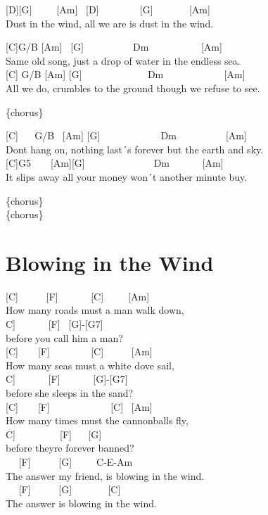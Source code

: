 \documentclass[
  letterpaper,
]{scrbook}
\begin{document}
{[}D{]}{[}G{]} ~ ~ ~{[}Am{]} ~{[}D{]} ~ ~ ~ ~ ~{[}G{]} ~ ~ ~ ~
{[}Am{]}\\
Dust in the wind, all we are is dust in the wind.

{[}C{]}G/B {[}Am{]} ~{[}G{]} ~ ~ ~ ~ ~ ~Dm ~ ~ ~ ~ ~ ~ {[}Am{]}\\
Same old song, just a drop of water in the endless sea.\\
{[}C{]} G/B {[}Am{]} {[}G{]} ~ ~ ~ ~ ~ ~ ~ ~Dm ~ ~ ~ ~ ~ ~ ~ {[}Am{]}\\
All we do, crumbles to the ground though we refuse to see.

\{chorus\}

{[}C{]} ~ ~G/B ~{[}Am{]} {[}G{]} ~ ~ ~ ~ ~ ~ ~ Dm ~ ~ ~ ~ ~ ~{[}Am{]}\\
Don\textquotesingle t hang on, nothing last´s forever but the earth and
sky.\\
{[}C{]}G5 ~ ~ {[}Am{]}{[}G{]} ~ ~ ~ ~ ~ ~ ~ ~ Dm ~ ~ ~ ~{[}Am{]}\\
It slips away all your money won´t another minute buy.

\{chorus\}\\
\{chorus\}

\hypertarget{blowing-in-the-wind}{%
\chapter{Blowing in the Wind}\label{blowing-in-the-wind}}

{[}C{]} ~ ~ ~ {[}F{]} ~ ~ ~ ~{[}C{]} ~ ~ ~{[}Am{]}\\
How many roads must a man walk down,\\
\hspace*{0.333em}{[}C{]} ~ ~ ~ ~{[}F{]} ~{[}G{]}-{[}G7{]}\\
before you call him a man?\\
{[}C{]} ~ ~ {[}F{]} ~ ~ ~ ~ ~{[}C{]} ~ ~ ~ {[}Am{]}\\
How many seas must a white dove sail,\\
\hspace*{0.333em}{[}C{]} ~ ~ ~ ~{[}F{]} ~ ~ ~ ~{[}G{]}-{[}G7{]}\\
before she sleeps in the sand?\\
{[}C{]} ~ ~ {[}F{]} ~ ~ ~ ~ ~ ~ ~ {[}C{]} ~{[}Am{]}\\
How many times must the cannonballs fly,\\
\hspace*{0.333em}{[}C{]} ~ ~ ~ ~ ~ {[}F{]} ~ ~{[}G{]}\\
before they\textquotesingle re forever banned?\\
\hspace*{0.333em} ~ ~{[}F{]} ~ ~ ~ {[}G{]} ~ ~ ~C-E-Am ~ ~ ~ ~ ~ ~\\
The answer my friend, is blowing in the wind.\\
\hspace*{0.333em} ~ ~{[}F{]} ~ ~ ~ {[}G{]} ~ ~ ~ ~ {[}C{]}\\
The answer is blowing in the wind.
\end{document}
